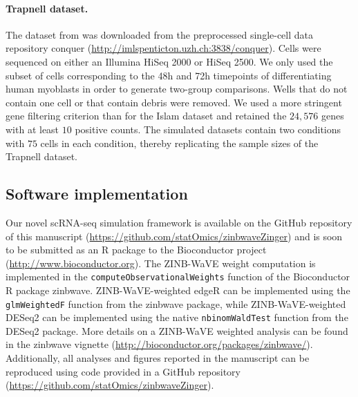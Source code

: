 \documentclass{bmcart}
\newcommand{\RPack}[1]{\textsf{#1}}
\newcommand{\RObj}[1]{\texttt{#1}}
\begin{document}
\paragraph{Trapnell dataset.} 
The dataset from \citet{Trapnell2013} was downloaded from the preprocessed single-cell data repository conquer (\url{http://imlspenticton.uzh.ch:3838/conquer}). Cells were sequenced on either an Illumina HiSeq 2000 or HiSeq 2500. We only used the subset of cells corresponding to the 48h and 72h timepoints of differentiating human myoblasts in order to generate two-group comparisons. Wells that do not contain one cell or that contain debris were removed. We used a more stringent gene filtering criterion than for the Islam dataset and retained the $24,576$ genes with at least $10$ positive counts. The simulated datasets contain two conditions with $75$ cells in each condition, thereby replicating the sample sizes of the Trapnell dataset.

\subsection*{Software implementation} 
Our novel scRNA-seq simulation framework is available on the GitHub repository of this manuscript (\url{https://github.com/statOmics/zinbwaveZinger}) and is soon to be submitted as an R package to the Bioconductor project (\url{http://www.bioconductor.org}).
The ZINB-WaVE weight computation is implemented in the \RObj{computeObservationalWeights} function of the Bioconductor R package \RPack{zinbwave}. 
ZINB-WaVE-weighted \RPack{edgeR} can be implemented using the \RObj{glmWeightedF} function from the \RPack{zinbwave} package, while ZINB-WaVE-weighted \RPack{DESeq2} can be implemented using the native \RObj{nbinomWaldTest} function from the \RPack{DESeq2} package. More details on a ZINB-WaVE weighted analysis can be found in the \RPack{zinbwave} vignette (\url{http://bioconductor.org/packages/zinbwave/}).
Additionally, all analyses and figures reported in the manuscript can be reproduced using code provided in a GitHub repository (\url{https://github.com/statOmics/zinbwaveZinger}). 



\end{document}
